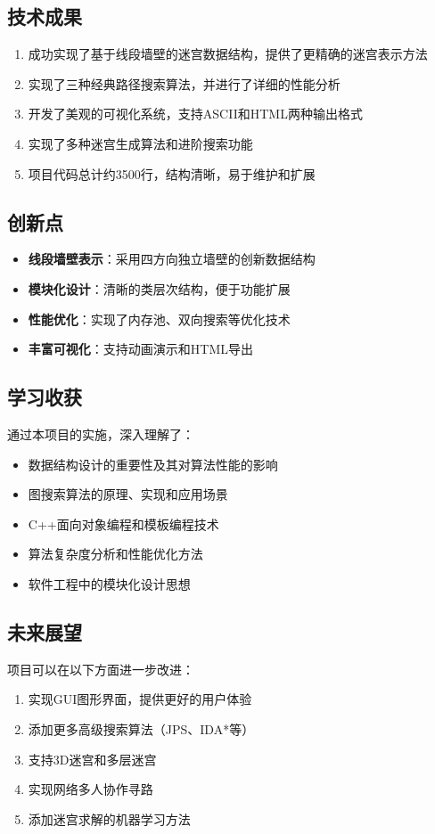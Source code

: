 \documentclass[UTF8]{ctexart}
\begin{document}
\subsection{技术成果}
\begin{enumerate}
    \item 成功实现了基于线段墙壁的迷宫数据结构，提供了更精确的迷宫表示方法
    \item 实现了三种经典路径搜索算法，并进行了详细的性能分析
    \item 开发了美观的可视化系统，支持ASCII和HTML两种输出格式
    \item 实现了多种迷宫生成算法和进阶搜索功能
    \item 项目代码总计约3500行，结构清晰，易于维护和扩展
\end{enumerate}

\subsection{创新点}
\begin{itemize}
    \item \textbf{线段墙壁表示}：采用四方向独立墙壁的创新数据结构
    \item \textbf{模块化设计}：清晰的类层次结构，便于功能扩展
    \item \textbf{性能优化}：实现了内存池、双向搜索等优化技术
    \item \textbf{丰富可视化}：支持动画演示和HTML导出
\end{itemize}

\subsection{学习收获}
通过本项目的实施，深入理解了：
\begin{itemize}
    \item 数据结构设计的重要性及其对算法性能的影响
    \item 图搜索算法的原理、实现和应用场景
    \item C++面向对象编程和模板编程技术
    \item 算法复杂度分析和性能优化方法
    \item 软件工程中的模块化设计思想
\end{itemize}

\subsection{未来展望}
项目可以在以下方面进一步改进：
\begin{enumerate}
    \item 实现GUI图形界面，提供更好的用户体验
    \item 添加更多高级搜索算法（JPS、IDA*等）
    \item 支持3D迷宫和多层迷宫
    \item 实现网络多人协作寻路
    \item 添加迷宫求解的机器学习方法
\end{enumerate}
\end{document}
